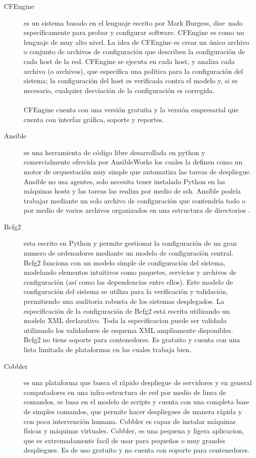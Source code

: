 \begin{description}
\item [CFEngine]
es un sistema basado en el lenguaje escrito por Mark Burgess, dise~nado específicamente para probar y configurar software. CFEngine es como un lenguaje de muy alto nivel. La idea de CFEngine es crear un único archivo o conjunto de archivos de configuración que describen la configuración de cada host de la red. CFEngine se ejecuta en cada host, y analiza cada archivo (o archivos), que especifica una política para la configuración del sistema; la configuración del host es verificada contra el modelo y, si es necesario, cualquier desviación de la configuración es corregida. \cite{cfengine15}\\
\\
CFEngine cuenta con una versión gratuita y la versión empresarial que cuenta con interfaz gráfica, soporte y reportes.

\item [Ansible]
es una herramienta de código libre desarrollada en python y comercialmente ofrecida por AnsibleWorks los cuales la definen como un motor de orquestación muy simple que automatiza las tareas de despliegue. Ansible no usa agentes, solo necesita tener instalado Python en las máquinas hosts y las tareas las realiza por medio de ssh. Ansible podría trabajar mediante un solo archivo de configuración que contendría todo o por medio de varios archivos organizados en una estructura de directorios \cite{ans16}. 

\item [Bcfg2]
esta escrito en Python y permite gestionar la configuración de un gran numero de ordenadores mediante un modelo de configuración central. Bcfg2 funciona con un modelo simple de configuración del sistema, modelando elementos intuitivos como paquetes, servicios y archivos de configuración (así como las dependencias entre ellos). Este modelo de configuración del sistema se utiliza para la verificación  y validación, permitiendo una auditoria robusta de los sistemas desplegados. La especificación de la configuración de Bcfg2 está escrita utilizando un modelo XML declarativo. Toda la especificacion puede ser validada utilizando los validadores de esquema XML ampliamente disponibles. Bcfg2 no tiene soporte para contenedores. Es gratuito y cuenta con una lista limitada de plataformas en las cuales trabaja bien.\cite{bdfg215}

\item [Cobbler]
 es una plataforma que busca el rápido despliegue de servidores y en general computadores en una infra-estructura de red por medio de linea de comandos, se basa en el modelo de scripts y cuenta con una completa base de simples comandos, que permite hacer despliegues de manera rápida y con poca intervención humana. Cobbler es capaz de instalar máquinas físicas y máquinas virtuales. Cobbler, es una pequena y ligera aplicacion, que es extremadamente facil de usar para pequeños o muy grandes despliegues. Es de uso gratuito y no cuenta con soporte para contenedores. \cite{Cobbler15}


\end{description}
